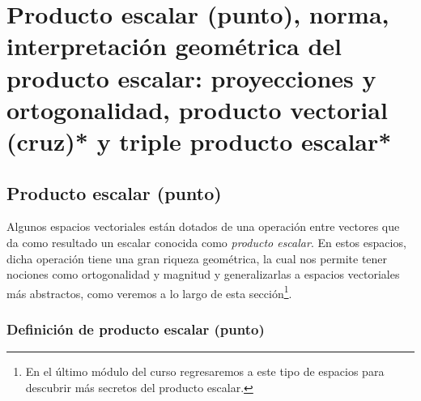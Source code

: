 \section{Producto escalar (punto), norma, interpretación geométrica del producto escalar: proyecciones y ortogonalidad, producto vectorial (cruz)* y triple producto escalar*} \label{Sec:2}

\subsection{Producto escalar (punto)} \label{Subsec:Producto_escalar}

Algunos espacios vectoriales están dotados de una operación entre vectores que da como resultado un escalar conocida como \emph{producto escalar}. En estos espacios, dicha operación tiene una gran riqueza geométrica, la cual nos permite tener nociones como ortogonalidad y magnitud \textemdash y generalizarlas a espacios vectoriales más abstractos, como veremos a lo largo de esta sección\footnote{En el último módulo del curso regresaremos a este tipo de espacios para descubrir más secretos del producto escalar.}.

\subsubsection{Definición de producto escalar (punto)} \label{Def:Producto_escalar}

